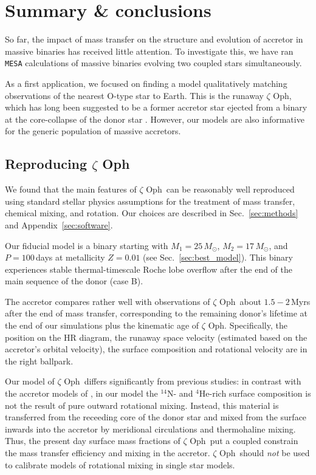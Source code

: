 \documentclass[twocolumn,twocolappendix,trackchanges]{aastex63}
\DeclareRobustCommand{\Secref}[1]{Sec.~\ref{#1}}
\newcommand{\zoph}{$\zeta$ Oph}
\begin{document}
\section{Summary \& conclusions}
\label{sec:conclusions}

So far, the impact of mass transfer on the structure and evolution of accretor in massive
binaries has received little attention.  To investigate this, we have
ran \texttt{MESA} calculations of massive binaries evolving two
coupled stars simultaneously.

As a first application, we focused on finding a model qualitatively
matching observations of the nearest O-type star to Earth. This is the
runaway \zoph, which has long been suggested to be a former accretor
star ejected from a binary at the core-collapse of the
donor star \citep[binary SN scenario,][]{blaauw:61}. However, our
models are also informative for the generic population of massive
accretors.

\subsection{Reproducing \zoph}

We found that the main features of \zoph\ can be
reasonably well reproduced using standard stellar physics
assumptions for the treatment of mass transfer, chemical mixing, and
rotation. Our choices are described in \Secref{sec:methods} and
Appendix~\ref{sec:software}.

Our fiducial model is a binary starting
with $M_1=25\,M_\odot$, $M_2=17\,M_\odot$, and $P=100$\,days at
metallicity $Z=0.01$ (see \Secref{sec:best_model}). This binary
experiences stable thermal-timescale Roche lobe overflow after the end
of the main sequence of the donor (case B).

The accretor
compares rather well with observations of \zoph\ about $1.5-2$\,Myrs
after the end of mass transfer, corresponding to the remaining donor's
lifetime at the end of our simulations plus the kinematic age of
\zoph. Specifically, the position on the HR diagram, the runaway space
velocity (estimated based on the accretor's orbital velocity), the
surface composition and rotational velocity are in the right ballpark.

Our model of \zoph\ differs significantly from previous studies: in
contrast with the accretor models of \cite{vanrensbergen:96}, in our
model the $^{14}\mathrm{N}$- and $^4\mathrm{He}$-rich surface
composition is not the result of pure outward rotational mixing.
Instead, this material is transferred from the receeding core of the
donor star and mixed from the surface inwards into the accretor by
meridional circulations and thermohaline mixing.  Thus, the present
day surface mass fractions of \zoph\ put a coupled constrain the mass
transfer efficiency and mixing in the accretor. \zoph\ should
\emph{not} be used to calibrate models of rotational mixing in single
star models.
\end{document}
